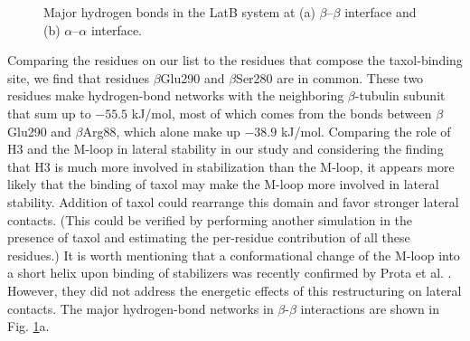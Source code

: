 \documentclass[11pt]{report}
\begin{document}
\begin{figure}
  \centering
  \caption[Major hydrogen bonds in the LatB system]{Major hydrogen bonds in the LatB system
  at (a) $\beta$--$\beta$ interface and (b) $\alpha$--$\alpha$ interface.}
  \hspace{0.05\linewidth}
  \label{f:THB-latB}
\end{figure}
Comparing the residues on our list to the residues that compose the taxol-binding site, we find that residues $\beta$Glu290 and $\beta$Ser280 are in common. These two residues make hydrogen-bond networks with the neighboring $\beta$-tubulin subunit that sum up to $-55.5$ kJ/mol, most of which comes from the bonds between $\beta$Glu290 and
$\beta$Arg88, which alone make up $-38.9$ kJ/mol. 
Comparing the role of H3 and the M-loop in lateral stability in our study and considering the finding that H3 is much more involved in stabilization than the M-loop, it appears more likely that the binding of taxol may make the M-loop more involved in lateral stability. Addition of taxol could rearrange this domain and favor stronger lateral contacts. (This could be verified by performing another simulation in the presence of taxol and estimating the per-residue contribution of all these residues.) It is worth mentioning that a conformational change of the M-loop into a short helix upon binding of stabilizers was recently confirmed by Prota et al.
\cite{Prota2013}. 
However, they did not address the energetic effects of this restructuring on lateral contacts. 
The major hydrogen-bond networks in $\beta$-$\beta$ interactions are shown in Fig.
\ref{f:THB-latB}a.
\end{document}

